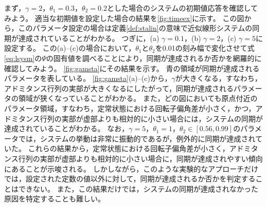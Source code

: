 \documentclass[tombow,dvipdfmx]{corona-a5}
\begin{document}
\begin{例}[近似線形システムの同期に関する数値実験]
まず，$\gamma=2$，$\theta_1=0.3$，$\theta_2=0.2$とした場合のシステムの初期値応答を確認してみよう。
適当な初期値を設定した場合の結果を\ref{fig:timeex}に示す。
この図から，このパラメータ設定の場合は定義\ref{def:stalin}の意味で近似線形システムの同期が達成されていることがわかる。
つぎに，(a) $\gamma=0.1$，(b) $\gamma=2$，(c) $\gamma=5$に設定する。
この(a)--(c)の場合において，$\theta_1$と$\theta_2$を0.01の刻み幅で変化させて式\ref{eq:lsysm}の$\Psi$の固有値を調べることにより，同期が達成されるか否かを網羅的に確認してみよう。
\ref{fig:gamsta}にその結果を示す。
青の領域が同期が達成されるパラメータを表している。
\ref{fig:gamsta}(a)--(c)から，$\gamma$が大きくなる，すなわち，アドミタンス行列の実部が大きくなるにしたがって，同期が達成されるパラメータの領域が狭くなっていることがわかる。
また，どの図においても原点付近のパラメータ領域，すなわち，定常状態における回転子偏角差が小さく，かつ，アドミタンス行列の実部が虚部よりも相対的に小さい場合には，システムの同期が達成されていることがわかる。
なお，$\gamma=5$，$\theta_1=1$，$\theta_2 \in [0.56,0.99]$のパラメータでは，システムの挙動は非常に振動的であるが，例外的に同期が達成されていた。
これらの結果から，定常状態における回転子偏角差が小さく，アドミタンス行列の実部が虚部よりも相対的に小さい場合に，同期が達成されやすい傾向にあることが示唆される。
しかしながら，このような実験的なアプローチだけでは，設定された定数の値以外に対して，同期が達成されるか否かを判定することはできない。
また，この結果だけでは，システムの同期が達成されなかった原因を特定することも難しい。
\end{例}
\end{document}

